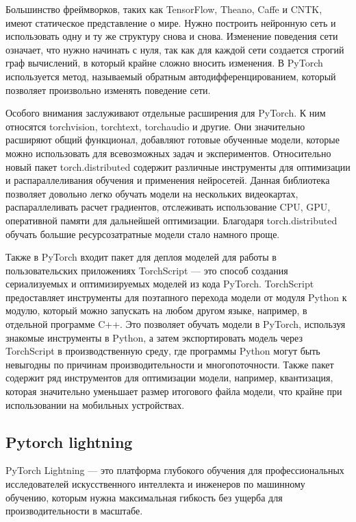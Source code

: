 Большинство фреймворков, таких как TensorFlow, Theano, Caffe и CNTK, имеют статическое представление о мире. Нужно построить нейронную сеть и использовать одну и ту же структуру снова и снова. Изменение поведения сети означает, что нужно начинать с нуля, так как для каждой сети создается строгий граф вычислений, в который крайне сложно вносить изменения.
В PyTorch используется метод, называемый обратным автодифференцированием, который позволяет произвольно изменять поведение сети. ~\cite{pytorch_github}

Особого внимания заслуживают отдельные расширения для PyTorch. К ним относятся torchvision, torchtext, torchaudio и другие. Они значительно расширяют общий функционал, добавляют готовые обученные модели, которые можно использовать для всевозможных задач и экспериментов. Относительно новый пакет torch.distributed содержит различные инструменты для оптимизации и распараллеливания обучения и применения нейросетей. Данная библиотека позволяет довольно легко обучать модели на нескольких видеокартах, распараллеливать расчет градиентов, отслеживать использование CPU, GPU, оперативной памяти для дальнейшей оптимизации. Благодаря torch.distributed обучать большие ресурсозатратные модели стало намного проще.

Также в PyTorch входит пакет для деплоя моделей для работы в пользовательских приложениях TorchScript — это способ создания сериализуемых и оптимизируемых моделей из кода PyTorch. TorchScript предоставляет инструменты для поэтапного перехода модели от модуля Python к модулю, который можно запускать на любом другом языке, например, в отдельной программе C++. Это позволяет обучать модели в PyTorch, используя знакомые инструменты в Python, а затем экспортировать модель через TorchScript в производственную среду, где программы Python могут быть невыгодны по причинам производительности и многопоточности. Также пакет содержит ряд инструментов для оптимизации модели, например, квантизация, которая значительно уменьшает размер итогового файла модели, что крайне при использовании на мобильных устройствах.

\subsection{Pytorch lightning}

PyTorch Lightning --- это платформа глубокого обучения для профессиональных исследователей искусственного интеллекта и инженеров по машинному обучению, которым нужна максимальная гибкость без ущерба для производительности в масштабе.

